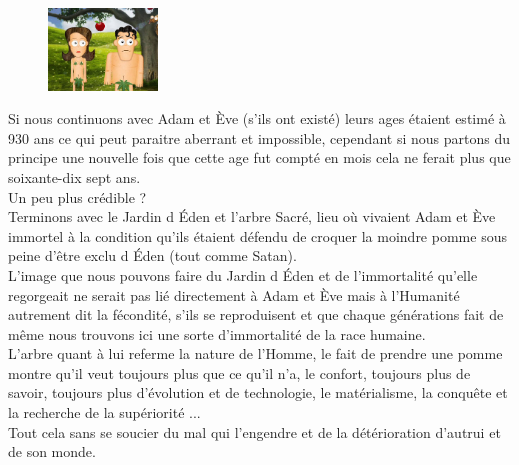 \begin{figure}
	\includegraphics[width=110px]{img11.png}
\end{figure}
Si nous continuons avec Adam et Ève (s'ils ont existé) leurs ages étaient estimé 
à 930 ans ce qui peut paraitre aberrant et impossible, cependant si nous partons 
du principe une nouvelle fois que cette age fut compté en mois cela ne ferait 
plus que soixante-dix sept ans. \\
Un peu plus crédible ?\\
Terminons avec le Jardin d Éden et l'arbre Sacré, lieu où vivaient Adam et Ève
immortel à la condition qu'ils étaient défendu de croquer la moindre pomme sous 
peine d'être exclu d Éden (tout comme Satan).\\
L'image que nous pouvons faire du Jardin d Éden et de l'immortalité qu'elle 
regorgeait ne serait pas lié directement à Adam et Ève mais à l'Humanité 
autrement dit la fécondité, s'ils se reproduisent et que chaque générations 
fait de même nous trouvons ici une sorte d'immortalité de la race humaine.\\
L'arbre quant à lui referme la nature de l'Homme, le fait de prendre une pomme 
montre qu'il veut toujours plus que ce qu'il n'a, le confort, toujours plus 
de savoir, toujours plus d'évolution et de technologie, le matérialisme, la 
conquête et la recherche de la supériorité ... \\Tout cela sans se soucier du mal
qui l'engendre et de la détérioration d'autrui et de son monde.


